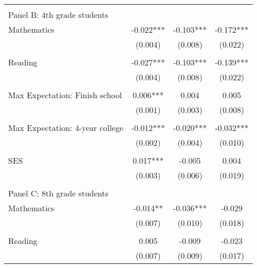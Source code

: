 {\begin{tabular}{lccc}
&  &  &   \\
\multicolumn{4}{l}{Panel B: 4th grade students } \\
\hspace{3mm}Mathematics&      -0.022***&      -0.103***&      -0.172***\\
                    &     (0.004)   &     (0.008)   &     (0.022)   \\
 
&  &  &   \\
\hspace{3mm}Reading &      -0.027***&      -0.103***&      -0.139***\\
                    &     (0.004)   &     (0.008)   &     (0.022)   \\
 
&  &  &   \\
\hspace{3mm}Max Expectation: Finish school&       0.006***&       0.004   &       0.005   \\
                    &     (0.001)   &     (0.003)   &     (0.008)   \\
 
&  &  &   \\
\hspace{3mm}Max Expectation: 4-year college&      -0.012***&      -0.020***&      -0.032***\\
                    &     (0.002)   &     (0.004)   &     (0.010)   \\
 
&  &  &   \\
\hspace{3mm}SES     &       0.017***&      -0.005   &       0.004   \\
                    &     (0.003)   &     (0.006)   &     (0.019)   \\
 
&  &  &   \\
\multicolumn{4}{l}{Panel C: 8th grade students } \\
\hspace{3mm}Mathematics&      -0.014** &      -0.036***&      -0.029   \\
                    &     (0.007)   &     (0.010)   &     (0.018)   \\
 
&  &  &   \\
\hspace{3mm}Reading &       0.005   &      -0.009   &      -0.023   \\
                    &     (0.007)   &     (0.009)   &     (0.017)   \\
 

\end{tabular}}
